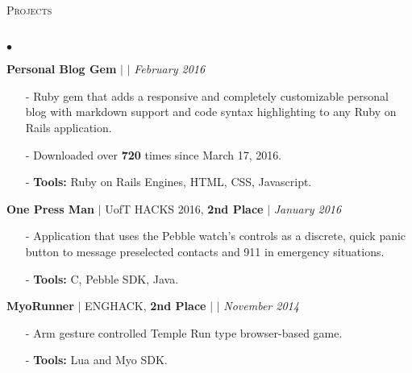 \documentclass[11pt]{article}
\newcommand{\lineunder}{\vspace*{-8pt} \\ \hspace*{-18pt} \hrulefill \\}
\newcommand{\header}[1]{{\hspace*{-15pt}\vspace*{6pt} \textsc{#1}} \vspace*{-6pt} \lineunder }
\newenvironment{achievements}{\begin{list}{$\bullet$}{\topsep 0pt \itemsep -1.5pt \leftmargin 5pt}}{\vspace*{4pt}\end{list}}
\begin{document}
\vspace{4pt}

\header{\fontsize{11.1}{10}\selectfont Projects}
\begin{achievements}
\def\UrlFont{\em}
\item \textbf{Personal Blog Gem}  $|$  \href{https://github.com/nakulpathak3/personal-blog-gem}{\faGithub}  $|$ \href{http://nakulpathak.com/blog}{\faExternalLink} \hfill \textit {February 2016}
\begin{itemize}
\item[-]Ruby gem that adds a responsive and completely customizable personal blog with markdown support and code syntax highlighting to any Ruby on Rails application.
\vspace{2pt}
\item[-]Downloaded over \textbf{720} times since March 17, 2016.
\vspace{2pt}
\item[-]\textbf{Tools:} Ruby on Rails Engines, HTML, CSS, Javascript.
\end{itemize}

\vspace{3pt}

\item \textbf{One Press Man} {$|$ \scriptsize UofT HACKS 2016, \textbf{2nd Place}} $|$  \href{https://github.com/adrianmachado/Onepressman}{\faGithub} \hfill \textit {January 2016}
\begin{itemize}
\item[-]Application that uses the Pebble watch's controls as a discrete, quick panic button to message preselected contacts and 911 in emergency situations.
\vspace{2pt}
\item[-]\textbf{Tools:} C, Pebble SDK, Java.
\end{itemize}

\vspace{3pt}

\item\textbf{MyoRunner} {$|$ \scriptsize ENGHACK, \textbf{2nd Place} }  $|$  \href{https://github.com/nakulpathak3/myorunner}{\faGithub} $|$ \href{http://jhudson.ca/myorunaway}{\faExternalLink} \hfill \textit {November 2014}
\begin{itemize}
\item[-]Arm gesture controlled Temple Run type browser-based game.
\vspace{2pt}
\item[-]\textbf{Tools:} Lua and Myo SDK.
\end{itemize}


\end{achievements}
\end{document}
